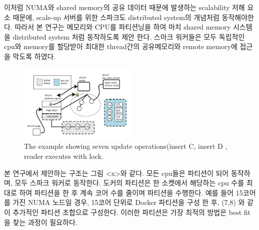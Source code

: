 \else

\fi

\ifkor
이처럼 NUMA와 shared memory의 공유 데이터 때문에 발생하는 scalability 저해 요소 때문에, 
scale-up 서버를 위한 스파크도 distributed system의 개념처럼 동작해야한다.
따라서 본 연구는 메모리와 CPU를 파티션닝을 하여 마치 shared memory 시스템을 distributed system 
처럼 동작하도록 제안 한다.
스마크 워커들은 모두 독립적인 cpu와 memory를 할당받아 최대한 thread간의 공유메모리와 remote
memory에 접근을 막도록 하였다.
\else

\fi

\begin{figure}[h]
  \begin{center}
     \includegraphics[width=0.5\textwidth]{fig/jaildocker}
  \end{center}
  \caption{The example showing seven update operations(insert C, insert D ,
  reader executes with lock.}
  \label{fig:basic}
\end{figure}


\ifkor
본 연구에서 제안하는 구조는 그림 <x>와 같다. 
모든 cpu들은 파티션이 되어 동작하며, 모두 스파크 워커로 동작한다.
도커의 파티션은 한 소켓에서 해당하는 cpu 수를 최대로 하여 파티션을 한 후 
계속 코어 수를 줄이며 파티션을 수행한다. 
예를 들어 15코어를 가진 NUMA 노드일 경우, 15코어 단위로 Docker 파티션을 구성 한 후,
(7,8) 와 같이 추가적인 파티션 조합으로 구성한다.
이러한 파티션은 
가장 최적의 방법은 best fit을 찾는 과정이 필요하다. 
\else

\fi


